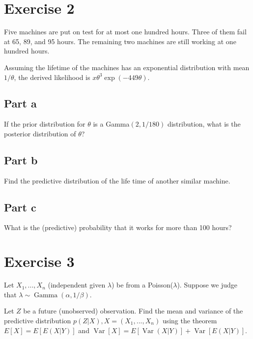 \documentclass{article}
\begin{document}
\section{Exercise 2}

Five machines are put on test for at most one hundred hours. Three of them fail at 65, 89, and 95 hours. The remaining two machines are still working at one hundred hours.

Assuming the lifetime of the machines has an exponential distribution with mean $1/\theta$, the derived likelihood is $x\theta^3 \exp(-449\theta)$.

\subsection{Part a}

If the prior distribution for $\theta$ is a Gamma$(2,1/180)$ distribution, what is the posterior distribution of $\theta$?

\subsection{Part b}

Find the predictive distribution of the life time of another similar machine.

\subsection{Part c}

What is the (predictive) probability that it works for more than 100 hours? 









\section{Exercise 3}

Let $X_1,...,X_n$ (independent given $\lambda$) be from a Poisson($\lambda$). Suppose we judge that $\lambda \sim \operatorname{Gamma}(\alpha, 1/\beta)$.

Let $Z$ be a future (unobserved) observation. Find the mean and variance of the predictive distribution $p(Z|X), X = (X_1,...,X_n)$ using the theorem $E[X] = E[E(X|Y)]$ and $\operatorname{Var}[X] = E[\operatorname{Var}(X|Y)] + \operatorname{Var}[E(X|Y)]$.
\end{document}
